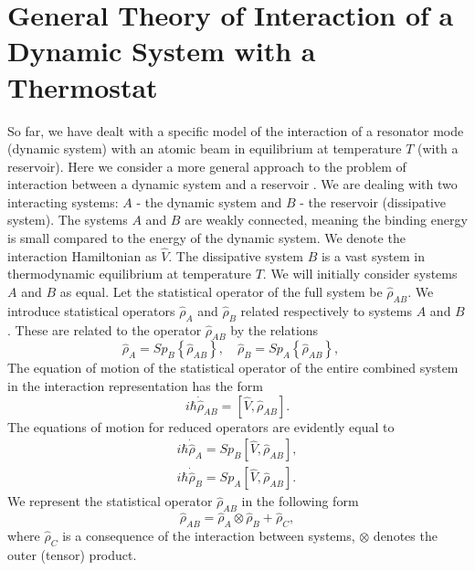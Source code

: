 \section{General Theory of Interaction of a Dynamic System with a Thermostat}

So far, we have dealt with a specific model of the interaction of a resonator mode (dynamic system) with an atomic beam in equilibrium at temperature $T$ (with a reservoir). Here we consider a more general approach to the problem of interaction between a dynamic system and a reservoir \cite{bLaks1974}. We are dealing with two interacting systems: $A$ - the dynamic system and $B$ - the reservoir (dissipative system). The systems $A$ and $B$ are weakly connected, meaning the binding energy is small compared to the energy of the dynamic system. We denote the interaction Hamiltonian as $\hat{V}$. The dissipative system $B$ is a vast system in thermodynamic equilibrium at temperature $T$. We will initially consider systems $A$ and $B$ as equal. Let the statistical operator of the full system be $\hat{\rho}_{AB}$. We introduce statistical operators $\hat{\rho}_{A}$ and $\hat{\rho}_{B}$ related respectively to systems $A$ and $B$. These are related to the operator $\hat{\rho}_{AB}$ by the relations 
\begin{equation}
\hat{\rho}_{A} = Sp_B\left\{\hat{\rho}_{AB}\right\}, \quad
\hat{\rho}_{B} = Sp_A\left\{\hat{\rho}_{AB}\right\}, \quad
\label{eqCh2_78}
\end{equation}
The equation of motion of the statistical operator of the entire combined system in the interaction representation has the form 
\begin{equation}
i\hbar\dot{\hat{\rho}}_{AB}
 = \left[
\hat{V}, \hat{\rho}_{AB}
\right].
\label{eqCh2_79}
\end{equation}
The equations of motion for reduced operators are evidently equal to
\begin{eqnarray}
i\hbar\dot{\hat{\rho}}_{A} = Sp_B
\left[
\hat{V}, \hat{\rho}_{AB}
\right],
\nonumber \\
i\hbar\dot{\hat{\rho}}_{B} = Sp_A
\left[
\hat{V}, \hat{\rho}_{AB}
\right].
\label{eqCh2_80}
\end{eqnarray}
We represent the statistical operator $\hat{\rho}_{AB}$ in the following form
\begin{equation}
\hat{\rho}_{AB} = \hat{\rho}_{A} \otimes \hat{\rho}_{B} + \hat{\rho}_{C},
\label{eqCh2_81}
\end{equation}
where $\hat{\rho}_{C}$ is a consequence of the interaction between systems, $\otimes$ denotes the outer (tensor) product.
